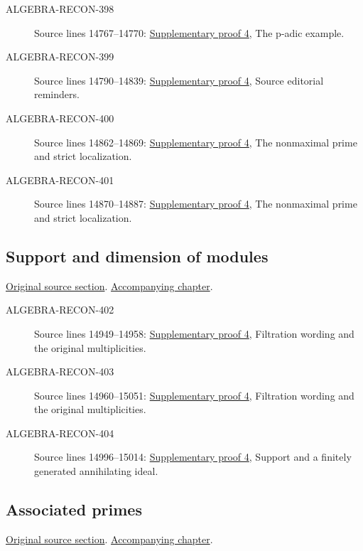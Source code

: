 \begin{description}
\item[ALGEBRA-RECON-398] Source lines 14767--14770: \hyperlink{algebra_dimension_support_associated_notes_20260927}{Supplementary proof 4}, The p-adic example.
\item[ALGEBRA-RECON-399] Source lines 14790--14839: \hyperlink{algebra_dimension_support_associated_notes_20260927}{Supplementary proof 4}, Source editorial reminders.
\item[ALGEBRA-RECON-400] Source lines 14862--14869: \hyperlink{algebra_dimension_support_associated_notes_20260927}{Supplementary proof 4}, The nonmaximal prime and strict localization.
\item[ALGEBRA-RECON-401] Source lines 14870--14887: \hyperlink{algebra_dimension_support_associated_notes_20260927}{Supplementary proof 4}, The nonmaximal prime and strict localization.
\end{description}

\subsection{Support and dimension of modules}
\hypertarget{algebra-source-section-support}{}
\noindent\href{https://github.com/stacks/stacks-project/blob/a04446e57ec1fbc252a871afcec7752fb2807b14/algebra.tex\#L14909}{Original source section}. \href{algebra.pdf\#nameddest=section-support}{Accompanying chapter}.

\begin{description}
\item[ALGEBRA-RECON-402] Source lines 14949--14958: \hyperlink{algebra_dimension_support_associated_notes_20260927}{Supplementary proof 4}, Filtration wording and the original multiplicities.
\item[ALGEBRA-RECON-403] Source lines 14960--15051: \hyperlink{algebra_dimension_support_associated_notes_20260927}{Supplementary proof 4}, Filtration wording and the original multiplicities.
\item[ALGEBRA-RECON-404] Source lines 14996--15014: \hyperlink{algebra_dimension_support_associated_notes_20260927}{Supplementary proof 4}, Support and a finitely generated annihilating ideal.
\end{description}

\subsection{Associated primes}
\hypertarget{algebra-source-section-ass}{}
\noindent\href{https://github.com/stacks/stacks-project/blob/a04446e57ec1fbc252a871afcec7752fb2807b14/algebra.tex\#L15099}{Original source section}. \href{algebra.pdf\#nameddest=section-ass}{Accompanying chapter}.


